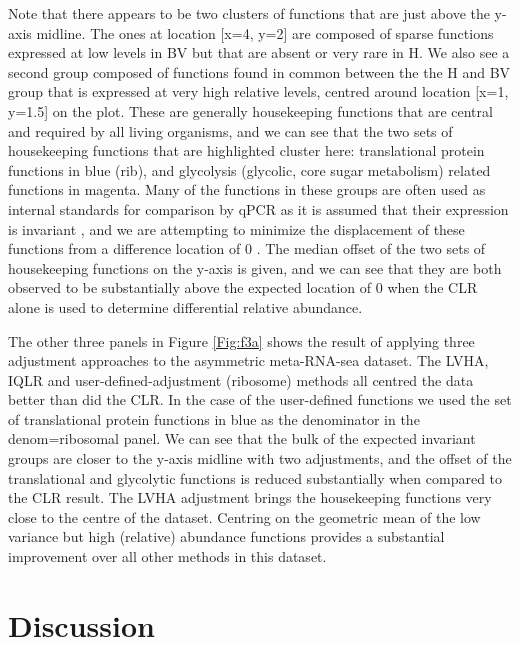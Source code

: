 \documentclass[graybox]{svmult}
\begin{document}
Note that there appears to be two clusters of functions that are just above the y-axis midline. The ones at location [x=4, y=2] are composed of sparse functions expressed at low levels in BV but that are absent or very rare in H.  We also see a second group composed of functions found in common between the the H and BV group that is  expressed at very high relative levels, centred around location [x=1, y=1.5] on the  plot. These are generally housekeeping functions that are central and required by all living organisms, and we can see that the two sets of housekeeping functions that are  highlighted cluster here: translational protein functions in blue (rib), and glycolysis (glycolic, core sugar metabolism) related functions in magenta. Many of the functions in these groups are often used as internal standards for comparison by qPCR as it is assumed that their expression is invariant \cite{Scott:2010}, and we are attempting to minimize the displacement of these functions from a difference location of 0 . The median offset of the two sets of housekeeping functions  on the y-axis is given, and we can see that they are both observed to be substantially above the expected location of 0 when the CLR alone is used to determine differential relative abundance.   

The other three panels in Figure \ref{Fig:f3a} shows the result of applying  three adjustment approaches to the asymmetric meta-RNA-sea dataset. The LVHA, IQLR and user-defined-adjustment (ribosome) methods all centred the data  better than did the CLR. In the case of the user-defined functions we used the set of translational protein functions in blue as the denominator in the denom=ribosomal panel. We can see that the bulk of the expected invariant groups are closer to the y-axis midline with two adjustments, and the offset of the translational and glycolytic functions is reduced substantially when compared to the CLR result. The LVHA adjustment brings the housekeeping functions very close to the centre of the dataset.  Centring on the geometric mean of the low variance but high (relative) abundance functions provides a substantial improvement over all other methods in this dataset.

\section*{Discussion}
\end{document}
